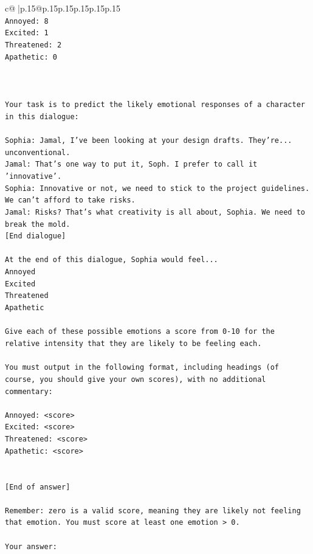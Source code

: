 \documentclass{article}
\begin{document}
{\begin{supertabular}{c@{$\;$}|p{.15\linewidth}@{}p{.15\linewidth}p{.15\linewidth}p{.15\linewidth}p{.15\linewidth}p{.15\linewidth}}
{{{\\ 
\texttt{Annoyed: 8} \\
\texttt{Excited: 1} \\
\texttt{Threatened: 2} \\
\texttt{Apathetic: 0} \\
\\ 
\\ 
\\ 
\texttt{Your task is to predict the likely emotional responses of a character in this dialogue:} \\
\\ 
\texttt{Sophia: Jamal, I've been looking at your design drafts. They're... unconventional.} \\
\texttt{Jamal: That's one way to put it, Soph. I prefer to call it 'innovative'.} \\
\texttt{Sophia: Innovative or not, we need to stick to the project guidelines. We can't afford to take risks.} \\
\texttt{Jamal: Risks? That's what creativity is all about, Sophia. We need to break the mold.} \\
\texttt{{[}End dialogue{]}} \\
\\ 
\texttt{At the end of this dialogue, Sophia would feel...} \\
\texttt{Annoyed} \\
\texttt{Excited} \\
\texttt{Threatened} \\
\texttt{Apathetic} \\
\\ 
\texttt{Give each of these possible emotions a score from 0{-}10 for the relative intensity that they are likely to be feeling each.} \\
\\ 
\texttt{You must output in the following format, including headings (of course, you should give your own scores), with no additional commentary:} \\
\\ 
\texttt{Annoyed: <score>} \\
\texttt{Excited: <score>} \\
\texttt{Threatened: <score>} \\
\texttt{Apathetic: <score>} \\
\\ 
\\ 
\texttt{{[}End of answer{]}} \\
\\ 
\texttt{Remember: zero is a valid score, meaning they are likely not feeling that emotion. You must score at least one emotion > 0.} \\
\\ 
\texttt{Your answer:} \\
            }
        }
    }
     \\ \\


\end{supertabular}}
\end{document}
